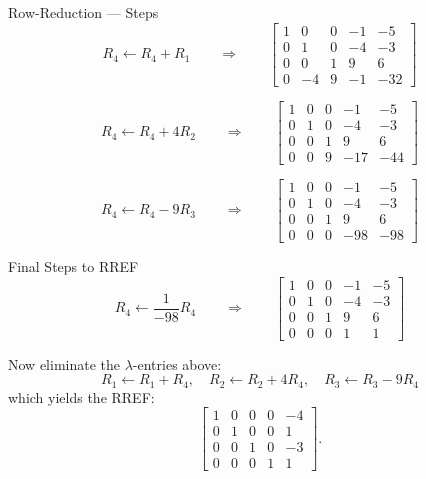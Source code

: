 \documentclass{beamer}
\begin{document}
\begin{frame}{Row-Reduction — Steps}
\begin{equation}\label{eq:step1}
R_4 \leftarrow R_4 + R_1
\qquad\Longrightarrow\qquad
\left[\begin{array}{cccc|c}
1 & 0 & 0 & -1 & -5\\[4pt]
0 & 1 & 0 & -4 & -3\\[4pt]
0 & 0 & 1 & 9  & 6 \\[4pt]
0 & -4& 9 & -1 & -32
\end{array}\right]
\end{equation}

\begin{equation}\label{eq:step2}
R_4 \leftarrow R_4 + 4R_2
\qquad\Longrightarrow\qquad
\left[\begin{array}{cccc|c}
1 & 0 & 0 & -1 & -5\\[4pt]
0 & 1 & 0 & -4 & -3\\[4pt]
0 & 0 & 1 & 9  & 6 \\[4pt]
0 & 0 & 9 & -17 & -44
\end{array}\right]
\end{equation}

\begin{equation}\label{eq:step3}
R_4 \leftarrow R_4 - 9R_3
\qquad\Longrightarrow\qquad
\left[\begin{array}{cccc|c}
1 & 0 & 0 & -1 & -5\\[4pt]
0 & 1 & 0 & -4 & -3\\[4pt]
0 & 0 & 1 & 9  & 6 \\[4pt]
0 & 0 & 0 & -98 & -98
\end{array}\right]
\end{equation}
\end{frame}

\begin{frame}{Final Steps to RREF}
\begin{equation}\label{eq:step4}
R_4 \leftarrow \frac{1}{-98}R_4
\qquad\Longrightarrow\qquad
\left[\begin{array}{cccc|c}
1 & 0 & 0 & -1 & -5\\[4pt]
0 & 1 & 0 & -4 & -3\\[4pt]
0 & 0 & 1 & 9  & 6 \\[4pt]
0 & 0 & 0 & 1 & 1
\end{array}\right]
\end{equation}

Now eliminate the $\lambda$-entries above:
\[
R_1\leftarrow R_1+R_4,\quad
R_2\leftarrow R_2+4R_4,\quad
R_3\leftarrow R_3-9R_4
\]
which yields the RREF:
\begin{equation}\label{eq:rref}
\left[\begin{array}{cccc|c}
1 & 0 & 0 & 0 & -4\\[4pt]
0 & 1 & 0 & 0 & 1\\[4pt]
0 & 0 & 1 & 0 & -3\\[4pt]
0 & 0 & 0 & 1 & 1
\end{array}\right].
\end{equation}
\end{frame}
\end{document}
